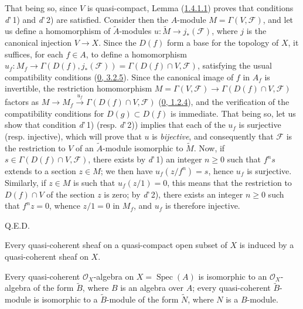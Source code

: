 That being so, since $V$ is quasi-compact, Lemma
(\hyperref[I.1.4.1.1]{1.4.1.1}) proves that conditions
\textit{d}'\,1) and \textit{d}'\,2) are satisfied. Consider then the
$A$-module $M=\Gamma(V,\mathscr{F})$, and let us define a homomorphism of
$\widetilde{A}$-modules $u:\widetilde{M}\to j_*(\mathscr{F})$, where $j$ is
the canonical injection $V\to X$. Since the $D(f)$ form a base for the
topology of $X$, it suffices, for each $f\in A$, to define a
homomorphism
$u_f:M_f\to\Gamma(D(f),j_*(\mathscr{F}))=\Gamma(D(f)\cap V,\mathscr{F})$,
satisfying the usual compatibility conditions
(\hyperref[0.3.2.5]{0, 3.2.5}). Since the canonical image of $f$ in
$A_f$ is invertible, the restriction homomorphism
$M=\Gamma(V,\mathscr{F})\to\Gamma(D(f)\cap V,\mathscr{F})$ factors as
$M\longrightarrow M_f\xrightarrow{u_f}\Gamma(D(f)\cap V,\mathscr{F})$
(\hyperref[0.1.2.4]{0, 1.2.4}), and the verification of the compatibility
conditions for $D(g)\subset D(f)$ is immediate. That being so, let us show
that condition \textit{d}'\,1) (resp. \textit{d}'\,2)) implies that each
of the $u_f$ is surjective (resp. injective), which will prove that $u$ is
\emph{bijective}, and consequently that $\mathscr{F}$ is the restriction to
$V$ of an $\widetilde{A}$-module isomorphic to $\widetilde{M}$. Now, if
$s\in\Gamma(D(f)\cap V,\mathscr{F})$, there exists by \textit{d}'\,1) an
integer $n\geq0$ such that $f^n s$ extends to a section $z\in M$; we then
have $u_f(z/f^n)=s$, hence $u_f$ is surjective. Similarly, if $z\in M$ is
such that $u_f(z/1)=0$, this means that the restriction to $D(f)\cap V$ of
the section $z$ is zero; by \textit{d}'\,2), there exists an integer
$n\geq0$ such that $f^n z=0$, whence $z/1=0$ in $M_f$, and $u_f$ is
therefore injective.

\par\hfill Q.E.D.\par

\begin{corollary}[1.4.2]
\label{I.1.4.2}
Every quasi-coherent sheaf on a quasi-compact open subset of $X$ is induced
by a quasi-coherent sheaf on $X$.
\end{corollary}

\begin{corollary}[1.4.3]
\label{I.1.4.3}
Every quasi-coherent $\mathscr{O}_X$-algebra on
$X=\operatorname{Spec}(A)$ is isomorphic to an $\mathscr{O}_X$-algebra of
the form $\widetilde{B}$, where $B$ is an algebra over $A$; every
quasi-coherent $\widetilde{B}$-module is isomorphic to a
$\widetilde{B}$-module of the form $\widetilde{N}$, where $N$ is a
$B$-module.
\end{corollary}


